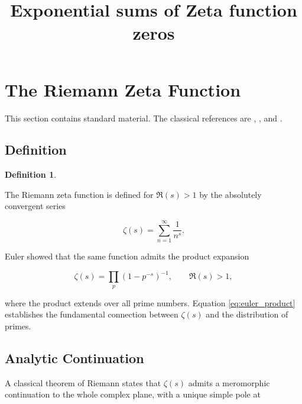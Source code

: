 \documentclass[11pt]{amsart}
\title{Exponential sums
of Zeta function zeros}
\author{}
\date{}
\numberwithin{equation}{section}
\theoremstyle{plain}
\theoremstyle{definition}
\newtheorem{definition}[theorem]{Definition}
\theoremstyle{remark}
\begin{document}
\maketitle

\tableofcontents

\bigskip


\section{The Riemann Zeta Function}
\label{sec:zeta_function}

This section contains standard material.
The classical references are
\cite{Titchmarsh1986},
\cite{Edwards2001},
and
\cite{IwaniecKowalski2004}.

\subsection{Definition}
\label{subsec:zeta_definition}

\begin{definition}
\label{def:zeta_function}

The Riemann zeta function is defined for
$\Re(s)>1$
by the absolutely convergent series

\begin{equation}
\zeta(s)
=
\sum_{n=1}^{\infty}
\frac{1}{n^{s}}.
\label{eq:zeta_dirichlet_series}
\end{equation}

\end{definition}

Euler showed that the same function admits the product expansion

\begin{equation}
\zeta(s)
=
\prod_{p}
\left(
1-p^{-s}
\right)^{-1},
\qquad
\Re(s)>1,
\label{eq:euler_product}
\end{equation}

where the product extends over all prime numbers.
Equation
\eqref{eq:euler_product}
establishes the fundamental connection between
$\zeta(s)$
and the distribution of primes.

\subsection{Analytic Continuation}
\label{subsec:analytic_continuation}

A classical theorem of Riemann states that
$\zeta(s)$
admits a meromorphic continuation to the whole complex plane,
with a unique simple pole at
\end{document}
